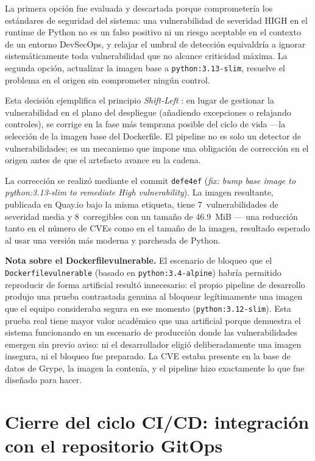 La primera opción fue evaluada y descartada porque comprometería los estándares de seguridad del sistema: una vulnerabilidad de severidad HIGH en el runtime de Python no es un falso positivo ni un riesgo aceptable en el contexto de un entorno DevSecOps, y relajar el umbral de detección equivaldría a ignorar sistemáticamente toda vulnerabilidad que no alcance criticidad máxima. La segunda opción, actualizar la imagen base a \texttt{python:3.13-slim}, resuelve el problema en el origen sin comprometer ningún control.

Esta decisión ejemplifica el principio \textit{Shift-Left} \cite{sharma2020devsecops}: en lugar de gestionar la vulnerabilidad en el plano del despliegue (añadiendo excepciones o relajando controles), se corrige en la fase más temprana posible del ciclo de vida ---la selección de la imagen base del Dockerfile. El pipeline no es solo un detector de vulnerabilidades; es un mecanismo que impone una obligación de corrección en el origen antes de que el artefacto avance en la cadena.

La corrección se realizó mediante el commit \texttt{defe4ef} (\textit{fix: bump base image to python:3.13-slim to remediate High vulnerability}). La imagen resultante, publicada en Quay.io bajo la misma etiqueta, tiene 7~vulnerabilidades de severidad media y 8~corregibles con un tamaño de 46.9~MiB --- una reducción tanto en el número de CVEs como en el tamaño de la imagen, resultado esperado al usar una versión más moderna y parcheada de Python.

\textbf{Nota sobre el Dockerfilevulnerable.} El escenario de bloqueo que el \texttt{Dockerfilevulnerable} (basado en \texttt{python:\allowbreak{}3.4-alpine}) habría permitido reproducir de forma artificial resultó innecesario: el propio pipeline de desarrollo produjo una prueba contrastada genuina al bloquear legítimamente una imagen que el equipo consideraba segura en ese momento (\texttt{python:3.12-slim}). Esta prueba real tiene mayor valor académico que una artificial porque demuestra el sistema funcionando en un escenario de producción donde las vulnerabilidades emergen sin previo aviso: ni el desarrollador eligió deliberadamente una imagen insegura, ni el bloqueo fue preparado. La CVE estaba presente en la base de datos de Grype, la imagen la contenía, y el pipeline hizo exactamente lo que fue diseñado para hacer.

\section{Cierre del ciclo CI/CD: integración con el repositorio GitOps}


